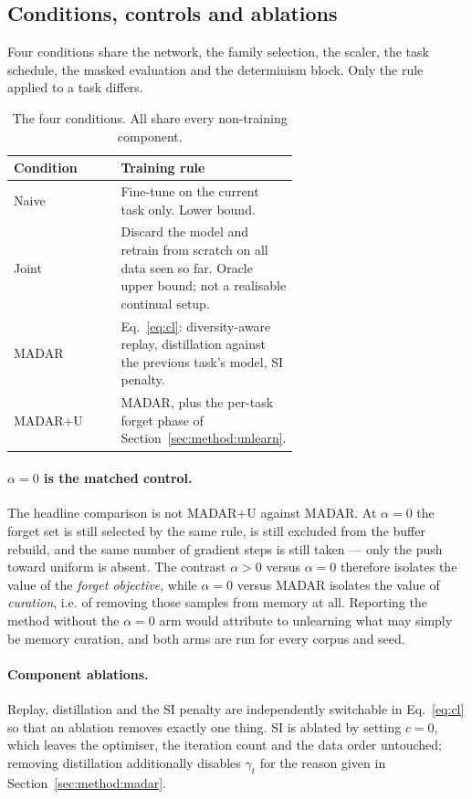 \subsection{Conditions, controls and ablations}
\label{sec:method:controls}

Four conditions share the network, the family selection, the scaler, the task
schedule, the masked evaluation and the determinism block. Only the rule applied
to a task differs.

\begin{table}[t]
  \centering
  \small
  \caption{The four conditions. All share every non-training component.}
  \label{tab:conditions}
  \begin{tabular}{@{}lp{0.62\linewidth}@{}}
    \toprule
    Condition & Training rule \\
    \midrule
    Naive & Fine-tune on the current task only. Lower bound. \\
    Joint & Discard the model and retrain from scratch on all data seen so far.
            Oracle upper bound; not a realisable continual setup. \\
    MADAR & Eq.~\eqref{eq:cl}: diversity-aware replay, distillation against the
            previous task's model, SI penalty. \\
    MADAR${+}$U & MADAR, plus the per-task forget phase of
            Section~\ref{sec:method:unlearn}. \\
    \bottomrule
  \end{tabular}
\end{table}

\paragraph{$\alpha = 0$ is the matched control.}
The headline comparison is not MADAR${+}$U against MADAR. At $\alpha = 0$ the
forget set is still selected by the same rule, is still excluded from the buffer
rebuild, and the same number of gradient steps is still taken --- only the push
toward uniform is absent. The contrast $\alpha > 0$ versus $\alpha = 0$ therefore
isolates the value of the \emph{forget objective}, while $\alpha = 0$ versus
MADAR isolates the value of \emph{curation}, i.e. of removing those samples from
memory at all. Reporting the method without the $\alpha = 0$ arm would attribute
to unlearning what may simply be memory curation, and both arms are run for every
corpus and seed.

\paragraph{Component ablations.}
Replay, distillation and the SI penalty are independently switchable in
Eq.~\eqref{eq:cl} so that an ablation removes exactly one thing. SI is ablated by
setting $c = 0$, which leaves the optimiser, the iteration count and the data
order untouched; removing distillation additionally disables $\gamma_t$ for the
reason given in Section~\ref{sec:method:madar}.

